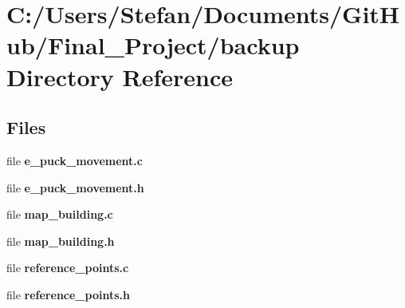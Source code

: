 \section{C\-:/\-Users/\-Stefan/\-Documents/\-Git\-Hub/\-Final\-\_\-\-Project/backup Directory Reference}
\label{dir_65fcd0c5a99507b1bc28fb9f25a53891}
\subsection*{Files}
\begin{DoxyCompactItemize}
\item 
file {\bf e\-\_\-puck\-\_\-movement.\-c}
\item 
file {\bf e\-\_\-puck\-\_\-movement.\-h}
\item 
file {\bf map\-\_\-building.\-c}
\item 
file {\bf map\-\_\-building.\-h}
\item 
file {\bf reference\-\_\-points.\-c}
\item 
file {\bf reference\-\_\-points.\-h}
\end{DoxyCompactItemize}
